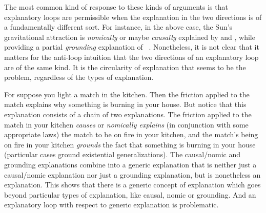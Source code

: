 The most common kind of response to these kinds of arguments is that explanatory loops are permissible when the explanation in the
two directions is of a fundamentally different sort. For instance, in the above case, the Sun's gravitational attraction is 
\textit{nomically} or maybe \textit{causally} explained by  and , while providing a partial \textit{grounding} 
explanation of ~\parencite{LoewerLawsTime}. Nonetheless, it is not clear that it matters for the anti-loop intuition that the two directions of an 
explanatory loop are of the same kind. It is the circularity of explanation that seems to be the problem, regardless
of the types of explanation.

For suppose you light a match in the kitchen. Then the friction applied to the match explains why something is burning in 
your house. But notice that this explanation consists of a chain of two explanations. The friction applied to the match in your 
kitchen \textit{causes} or \textit{nomically explains} (in conjunction with some appropriate laws) the match to be on fire in your kitchen, and the match's being on fire in your kitchen \textit{grounds} the 
fact that something is burning in your house (particular cases ground existential generalizations). The causal/nomic and grounding explanations
combine into a generic explanation that is neither just a causal/nomic explanation nor just a grounding explanation, but is nonetheless an 
explanation. This shows that there is a generic concept of explanation which goes beyond particular types of explanation, like 
causal, nomic or grounding. And an explanatory loop with respect to generic explanation is problematic.

